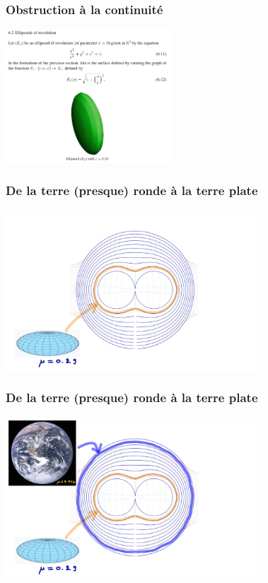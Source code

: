\documentclass[9pt]{beamer}
\begin{document}
\begin{frame}
\frametitle{\bf Obstruction \`a la continuit\'e}
 
\centering \includegraphics[height=5.0cm]{figal2}

\end{frame}

\begin{frame}
\frametitle{\bf De la terre (presque) ronde \`a la terre plate}
 
\centering \includegraphics[height=6.0cm]{oblat1}

\end{frame}

\begin{frame}
\frametitle{\bf De la terre (presque) ronde \`a la terre plate}
 
\centering \includegraphics[height=6.0cm]{oblat2}

\end{frame}
\end{document}
